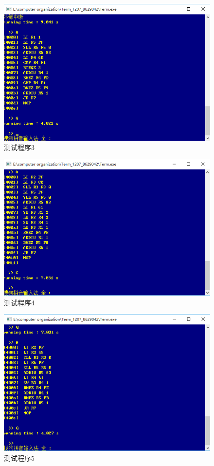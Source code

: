 \begin{figure}[H]
  \includegraphics[width=\linewidth]{Figures/cpu3.png}
  \caption{测试程序3}
\end{figure}

\begin{figure}[H]
  \includegraphics[width=\linewidth]{Figures/cpu4.png}
  \caption{测试程序4}
\end{figure}

\begin{figure}[H]
  \includegraphics[width=\linewidth]{Figures/cpu5.png}
  \caption{测试程序5}
\end{figure}

